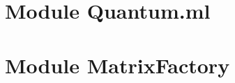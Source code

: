 \documentclass[a4paper,11pt]{tipe}
\begin{document}
\section{Module Quantum.ml}
\section{Module MatrixFactory}



\nocite*{} %


\end{document}
